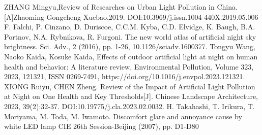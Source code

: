 \begin{thebibliography}{99}
     ZHANG Mingyu,Review of Researches on Urban Light Pollution in China.
    [A]Zhaoming Gongcheng Xuebao,2019.
    DOI:10.3969/j.issn.1004-440X.2019.05.006
     F. Falchi, P. Cinzano, D. Duriscoe, C.C.M. Kyba, C.D. Elvidge, K. Baugh, B.A. Portnov, N.A. Rybnikova, R. Furgoni. 
    The new world atlas of artificial night sky brightness. 
    Sci. Adv., 2 (2016), pp. 1-26, 10.1126/sciadv.1600377.
     Tongyu Wang, Naoko Kaida, Kosuke Kaida,
    Effects of outdoor artificial light at night on human health and behavior: A literature review,
    Environmental Pollution,
    Volume 323,
    2023,
    121321,
    ISSN 0269-7491,
    https://doi.org/10.1016/j.envpol.2023.121321.
     XIONG Ruiyu, CHEN Zheng. Review of the Impact of Artificial Light Pollution at Night on One Health and Key Thresholds[J]. 
    Chinese Landscape Architecture, 2023, 39(2):32-37. DOI:10.19775/j.cla.2023.02.0032.
     H. Takahashi, T. Irikura, T. Moriyama, M. Toda, M. Iwamoto. 
    Discomfort glare and annoyance cause by white LED lamp
    CIE 26th Session-Beijing (2007), pp. D1-D80

\end{thebibliography}